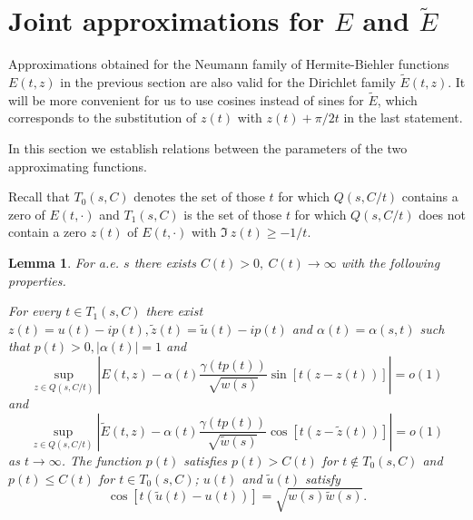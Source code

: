 \documentclass[11pt,twoside,reqno]{amsart}
\def\ti{\tilde}
\def\to{\rightarrow}
\def\g{\gamma}
\def\a{\alpha}
\theoremstyle{plain}
\newtheorem{lemma}{Lemma}
\numberwithin{equation}{section}
\begin{document}
\section{Joint approximations for $E$ and $\ti E$}\label{secJA}

Approximations obtained for the Neumann family of Hermite-Biehler functions $E(t,z)$ in the
previous section are also valid for the Dirichlet family $\ti E(t,z)$.
It will be more convenient for us to use cosines instead of sines for $\ti E$, which corresponds
to the substitution of $z(t)$ with $z(t)+\pi/2t$ in the last statement.

In this section
we establish relations between the parameters of the two approximating functions.


Recall that  $T_0(s,C)$ denotes the set of those $t$ for which $Q(s,C/t)$ contains a zero of $E(t,\cdot)$
and  $T_1(s,C)$ is the set of those $t$ for which $Q(s,C/t)$ does not contain a zero $z(t)$ of $E(t,\cdot)$
with $\Im\  z(t)\geq -1/t$.

\begin{lemma}\label{lemmacos}
For a.e. $s$ there exists $C(t)>0,\ C(t)\to\infty$ with the following properties.

For every $t\in T_1(s,C)$ there exist  $z(t)=u(t)-ip(t), \ti z(t)=\ti u(t)-ip(t)$ and $\alpha(t)=\a(s,t)$  such that
$p(t)> 0, |\a(t)|=1$ and
 $$\sup_{z\in Q(s,C/t)}\left|E(t,z)-\a(t)\frac{\g(tp(t))}{\sqrt{w(s)}}\sin[t(z-z(t))]\right|=o(1)$$ and
 $$\sup_{z\in Q(s,C/t)}\left|\ti E(t,z)-\a(t)\frac{\g(tp(t))}{\sqrt{\ti w(s)}}\cos[t(z-\ti z(t))]\right|=o(1)$$
 as $t\to\infty$. The function $p(t)$ satisfies $p(t)>C(t)$ for $t\not\in T_0(s,C)$ and
 $p(t)\leq C(t)$ for $t\in T_0(s,C)$; $u(t)$ and $\ti u(t)$ satisfy
\begin{equation}\cos [t(\ti u(t)-u(t))]=\sqrt{w(s)\ti w(s)}.\label{fin12}\end{equation}

%


%


\end{lemma}
\end{document}
